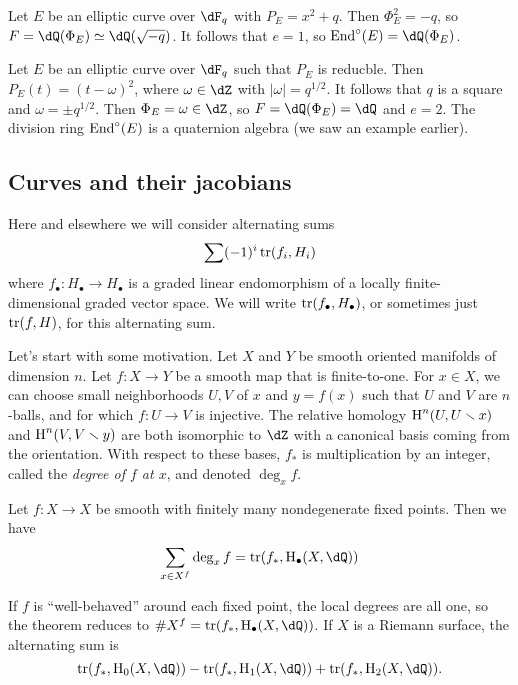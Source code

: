\documentclass{article}
\begin{document}
\begin{example}
Let $E$ be an elliptic curve over $\dF_q$ with $P_E=x^2+q$. Then $\Phi_E^2=-q$, 
so $F=\dQ(\Phi_E)\simeq\dQ(\sqrt{-q})$. It follows that $e=1$, so  
$\End^\circ(E)=\dQ(\Phi_E)$. 
\end{example}

\begin{example}
Let $E$ be an elliptic curve over $\dF_q$ such that $P_E$ is reducble. Then 
$P_E(t)=(t-\omega)^2$, where $\omega\in \dZ$ with $|\omega|=q^{1/2}$. It 
follows that $q$ is a square and $\omega=\pm q^{1/2}$. Then 
$\Phi_E=\omega\in \dZ$, so $F=\dQ(\Phi_E)=\dQ$ and $e=2$. The division ring  
$\operatorname{End}^\circ (E)$ is a quaternion algebra (we saw an example earlier). 
\end{example}


\subsection*{Curves and their jacobians} %

Here and elsewhere we will consider alternating sums 
\[
  \sum (-1)^i \operatorname{tr}(f_i,H_i)
\]
where $f_\bullet:H_\bullet \to H_\bullet$ is a graded linear endomorphism of a 
locally finite-dimensional graded vector space. We will write 
$\operatorname{tr}(f_\bullet,H_\bullet)$, or sometimes just $\operatorname{tr}(f,H)$, for this 
alternating sum. 

Let's start with some motivation. Let $X$ and $Y$ be smooth oriented manifolds 
of dimension $n$. Let $f:X\to Y$ be a smooth map that is finite-to-one. For 
$x\in X$, we can choose small neighborhoods $U,V$ of $x$ and $y=f(x)$ such 
that $U$ and $V$ are $n$-balls, and for which $f:U\to V$ is injective. 
The relative homology $\operatorname{H}^n(U,U\smallsetminus x)$ and $\operatorname{H}^n(V,V\smallsetminus y)$ are 
both isomorphic to $\dZ$ with a canonical basis coming from the orientation. 
With respect to these bases, $f_\ast$ is multiplication by an integer, called 
the \emph{degree of $f$ at $x$}, and denoted $\deg_x f$. 

\begin{theorem}[Lefschetz]
Let $f:X\to X$ be smooth with finitely many nondegenerate fixed points. Then 
we have 
\[
  \sum_{x\in X^f} \deg_x f = \trace(f_\ast,\h_\bullet(X,\dQ))
\]
\end{theorem}
If $f$ is ``well-behaved'' around each fixed point, the local degrees are all 
one, so the theorem reduces to $\# X^f=\trace(f_\ast,\h_\bullet(X,\dQ))$. If 
$X$ is a Riemann surface, the alternating sum is 
\[
  \trace(f_\ast,\h_0(X,\dQ)) - \trace(f_\ast,\h_1(X,\dQ)) + \trace(f_\ast,\h_2(X,\dQ))\text{.}
\]
\end{document}
